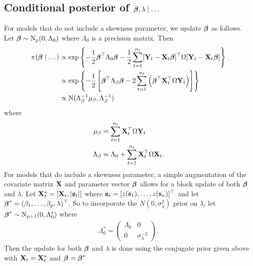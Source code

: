 \subsection*{Conditional posterior of $\mbox{\boldmath $\beta$}, \lambda \mid \ldots$}\label{sts:betapost}
For models that do not include a skewness parameter, we update $\mbox{\boldmath $\beta$}$ as follows.
Let $\mbox{\boldmath $\beta$} \sim \mbox{N}_{p}(0, \Lambda_0)$ where $\Lambda_0$ is a precision matrix.
Then
\begin{align*}
    \pi(\mbox{\boldmath $\beta$} \mid \ldots) & \propto \exp \left\{ - \frac{ 1 }{ 2 } \mbox{\boldmath $\beta$}^\top \Lambda_0 \mbox{\boldmath $\beta$} - \frac{ 1 }{ 2 } \sum_{t = 1}^{n_t} [\mathbf{Y}_t -\mathbf{X}_t \mbox{\boldmath $\beta$}]^\top \Omega [\mathbf{Y}_t - \mathbf{X}_t \mbox{\boldmath $\beta$}] \right\} \\
     & \propto \exp \left\{ -\frac{ 1 }{ 2 } \left[ \mbox{\boldmath $\beta$}^\top \Lambda_\beta \mbox{\boldmath $\beta$}  - 2 \sum_{t = 1}^{n_t} \left(\mbox{\boldmath $\beta$}^\top \mathbf{X}_t^\top \Omega \mathbf{Y}_t \right) \right] \right\} \\
     & \propto \mbox{N} ( \Lambda_\beta^{-1} \mu_\beta , \Lambda_\beta^{-1})
\end{align*}
where
\begin{align*}
    \mu_\beta &= \sum_{t = 1}^{n_t} \mathbf{X}_t^\top \Omega \mathbf{Y}_t \\
    \Lambda_\beta &= \Lambda_0 + \sum_{t = 1}^{n_t} \mathbf{X}_t^\top \Omega \mathbf{X}_t.
\end{align*}
For models that do include a skewness parameter, a simple augmentation of the covariate matrix $\mathbf{X}$ and parameter vector $\mbox{\boldmath $\beta$}$ allows for a block update of both $\mbox{\boldmath $\beta$}$ and $\lambda$.
Let $\mathbf{X}^*_{t} = [\mathbf{X}_t, |\mathbf{z}_{t}|]$ where $\mathbf{z}_t = [z(\mathbf{s}_1), \ldots, z(\mathbf{s}_{n})]^\top$ and let $\mbox{\boldmath $\beta$}^* = (\beta_1, \ldots, \beta_p, \lambda)^\top$.
So to incorporate the $N(0, \sigma^2_\lambda)$ prior on $\lambda$, let $\mbox{\boldmath $\beta$}^* \sim \mbox{N}_{p+1}(0, \Lambda^*_0)$ where
\begin{align*}
  \Lambda^*_0 = \left( \begin{array}{cc}
    \Lambda_0 & 0 \\
    0         & \sigma^{-2}_\lambda
  \end{array}\right).
\end{align*}
Then the update for both $\mbox{\boldmath $\beta$}$ and $\lambda$ is done using the conjugate prior given above with $\mathbf{X}_t = \mathbf{X}_t^*$ and $\mbox{\boldmath $\beta$} = \mbox{\boldmath $\beta$}^*$


